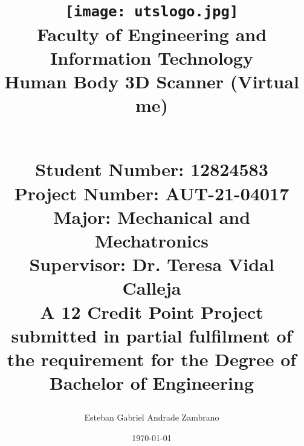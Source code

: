 \begin{titlepage}

   

    \title{\texttt{[image: utslogo.jpg]}\\[1cm]  
    Faculty of Engineering and Information Technology\\[1.0cm] 
    \Large{\textbf{Human Body 3D Scanner (Virtual me)}}\\[1.0cm] 
    {\author{Esteban Gabriel Andrade Zambrano}\\
    Student Number: 12824583\\
    Project Number: AUT-21-04017\\
    Major: Mechanical and Mechatronics\\
    Supervisor: Dr. Teresa Vidal Calleja\\[2.0cm]
    \small{A 12 Credit Point Project submitted in partial fulfilment of the requirement for the Degree of Bachelor of Engineering}
    }
    \date{\today}   
   }
   
\end{titlepage}